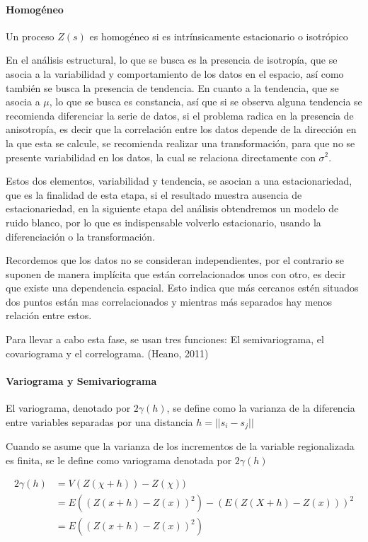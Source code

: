 \paragraph{Homogéneo}  Un proceso $Z(s)$ es homogéneo si es intrínsicamente estacionario o isotrópico


En el análisis estructural, lo que se busca es la presencia de  isotropía, que se asocia a la variabilidad y comportamiento de los datos en el espacio, así como también se busca la presencia de tendencia. En cuanto a la
tendencia, que se asocia a $\mu$, lo que se busca es constancia, así que si se observa alguna tendencia se recomienda diferenciar la serie de datos, si el problema radica en la presencia de anisotropía, es decir que la correlación entre los datos depende de la dirección en la que esta se calcule, se recomienda realizar una transformación, para que
no se presente variabilidad en los datos, la cual se relaciona directamente con $\sigma^2$. 

Estos dos elementos, variabilidad y tendencia, se asocian a una estacionariedad, que es la finalidad de esta etapa, si el resultado muestra ausencia de estacionariedad, en la siguiente etapa del análisis obtendremos un modelo de ruido blanco, por lo que es indispensable volverlo estacionario, usando la diferenciación o la transformación.


Recordemos que los datos no se consideran independientes, por el contrario se suponen de manera implícita que están correlacionados unos con otro, es decir que existe una dependencia espacial. Esto indica que más cercanos estén situados dos puntos están mas correlacionados y mientras más separados hay menos relación entre estos. \cite{notas_clase2}

Para llevar a cabo esta fase, se usan tres funciones: El semivariograma, el covariograma y el correlograma. (Heano, 2011) \cite{giraldo}  

\paragraph{Variograma y Semivariograma}

El variograma, denotado por $ 2\gamma(h)$, se define como la varianza de la diferencia entre variables separadas por una distancia $h = ||s_i - s_j||$

Cuando se asume que la varianza de los incrementos de la variable regionalizada es finita, se le define como variograma denotada por $2\gamma(h)$ 

\begin{equation*}
\begin{aligned}
   2\gamma(h) & = V(Z(\chi + h)) - Z(\chi))\\
  & = E((Z(x + h) - Z(x))^2) - (E(Z(X + h) - Z(x)))^2 \\
  & = E((Z(x + h) - Z(x))^2)
\end{aligned}
\end{equation*}

